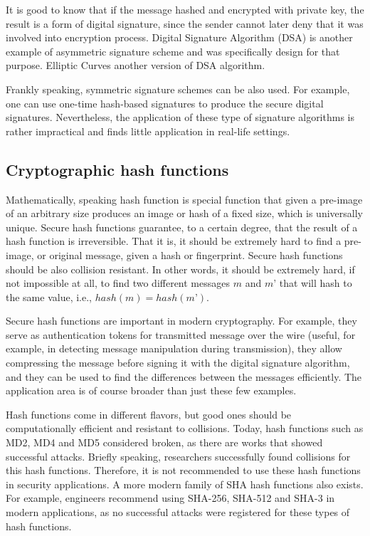 It is good to know that if the message hashed and encrypted with private key, the result is a 
form of digital signature, since the sender cannot later deny that it was involved into encryption 
process. Digital Signature Algorithm (DSA) is another example of asymmetric signature scheme and 
was specifically design for that purpose. Elliptic Curves another version of DSA algorithm.

Frankly speaking, symmetric signature schemes can be also used. For example, one can use 
one-time hash-based signatures to produce the secure digital signatures. Nevertheless, 
the application of these type of signature algorithms is rather impractical and finds 
little application in real-life settings.

\subsection{Cryptographic hash functions}

Mathematically, speaking hash function is special function that given a 
pre-image of an arbitrary size produces an image or hash of a fixed size, 
which is universally unique. Secure hash functions guarantee, to a certain 
degree, that the result of a hash function is irreversible. That it is, it 
should be extremely hard to find a pre-image, or original message, given a 
hash or fingerprint. Secure hash functions should be also collision resistant. 
In other words, it should be extremely hard, if not impossible at all, to 
find two different messages $m$ and $m’$ that will hash to the same value, i.e., 
$hash(m)=hash(m’)$.

Secure hash functions are important in modern cryptography. 
For example, they serve as authentication tokens for transmitted message over the 
wire (useful, for example, in detecting message manipulation during transmission), 
they allow compressing the message before signing it with the digital signature 
algorithm, and they can be used to find the differences between the messages 
efficiently. The application area is of course broader than just these few examples. 

Hash functions come in different flavors, but good ones should be computationally 
efficient and resistant to collisions. Today, hash functions such as MD2, MD4 and MD5 
considered broken, as there are works that showed successful attacks. Briefly speaking, 
researchers successfully found collisions for this hash functions. Therefore, it is 
not recommended to use these hash functions in security applications. A more modern 
family of SHA hash functions also exists. For example, engineers recommend using SHA-256, 
SHA-512 and SHA-3 in modern applications, as no successful attacks were registered for 
these types of hash functions.

